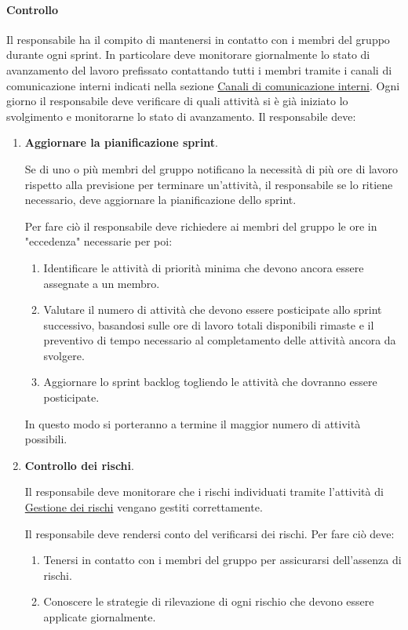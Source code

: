 \paragraph{Controllo}
Il responsabile ha il compito di mantenersi in contatto con i membri del gruppo durante ogni sprint.
In particolare deve monitorare giornalmente lo stato di avanzamento del lavoro prefissato contattando tutti i membri tramite i canali di comunicazione interni indicati nella sezione \hyperref[subpar:canali_interni]{Canali di comunicazione interni}.
Ogni giorno il responsabile deve verificare di quali attività si è già iniziato lo svolgimento e monitorarne lo stato di avanzamento.
Il responsabile deve:
\begin{enumerate}
    \item \textbf{Aggiornare la pianificazione sprint}.
    
    Se di uno o più membri del gruppo notificano la necessità di più ore di lavoro rispetto alla previsione per terminare un'attività, il responsabile se lo ritiene necessario, deve aggiornare la pianificazione dello sprint.  

    Per fare ciò il responsabile deve richiedere ai membri del gruppo le ore in "eccedenza" necessarie per poi:
    \begin{enumerate}
        \item Identificare le attività di priorità minima che devono ancora essere assegnate a un membro.
        \item Valutare il numero di attività che devono essere posticipate allo sprint successivo, basandosi sulle ore di lavoro totali disponibili rimaste e il preventivo di tempo necessario al completamento delle attività ancora da svolgere.
        \item Aggiornare lo sprint backlog togliendo le attività che dovranno essere posticipate.
    \end{enumerate}
    In questo modo si porteranno a termine il maggior numero di attività possibili.

    \item \textbf{Controllo dei rischi}.
    
    Il responsabile deve monitorare che i rischi individuati tramite l'attività di \hyperref[]{Gestione dei rischi} vengano gestiti correttamente.
    
    Il responsabile deve rendersi conto del verificarsi dei rischi.
    Per fare ciò deve:
    \begin{enumerate}
        \item Tenersi in contatto con i membri del gruppo per assicurarsi dell'assenza di rischi.
        \item Conoscere le strategie di rilevazione di ogni rischio che devono essere applicate giornalmente.
    \end{enumerate}


\end{enumerate}
